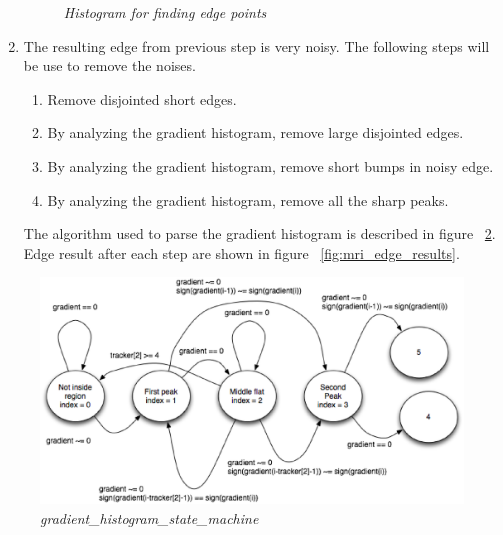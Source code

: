\begin{enumerate}
\begin{figure}[htb]
      \caption{\emph{Histogram for finding edge points}}
      \label{fig:mri_edge_point_histograms}
    \end{figure}
  \item The resulting edge from previous step is very noisy. The following steps will be use to remove the
    noises. 
    \begin{enumerate}
      \item Remove disjointed short edges.
      \item By analyzing the gradient histogram, remove large disjointed edges.
      \item By analyzing the gradient histogram, remove short bumps in noisy edge.
      \item By analyzing the gradient histogram, remove all the sharp peaks. 
    \end{enumerate}
    The algorithm used to parse the gradient histogram is described in figure ~\ref{fig:histogram_state_machine}. Edge result after each step are shown in figure ~\ref{fig:mri_edge_results}.
\end{enumerate}

\begin{figure}[htb]
  \hfill
  \begin{minipage}[b]{5in}
    \centering
    \centerline{\mbox{\includegraphics[width=5in]{data_extraction/images/MRI/histogram_state_machine.eps}}}
  \end{minipage}
  \hfill
  \caption{\emph{gradient_histogram_state_machine}}
  \label{fig:histogram_state_machine}
\end{figure}

